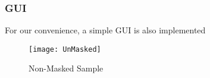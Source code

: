 \begin{frame}
    \frametitle{GUI}
    For our convenience, a simple GUI is also implemented
    \begin{figure}[H]
        \centering
        \texttt{[image: UnMasked]}
        \caption{Non-Masked Sample}
        \label{fig:UnMaskedSample}
    \end{figure}
\end{frame}
